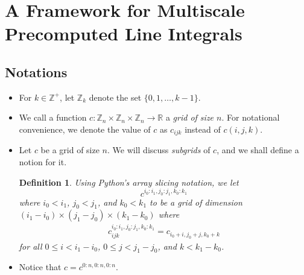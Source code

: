 \documentclass[10pt]{article}
\newtheorem{definition}[lemma]{Definition}
\begin{document}
\section{A Framework for Multiscale Precomputed Line Integrals}

\subsection{Notations}

\begin{itemize}
	\item For $k \in \mathbb{Z}^+$, let $\mathbb{Z}_k$ denote the set $\{ 0, 1, \dotsc, k-1 \}.$ 
	
	\item We call a function $c: \mathbb{Z}_n \times \mathbb{Z}_n \times \mathbb{Z}_n \rightarrow \mathbb{R}$ 
		a \emph{grid of size $n$}. For notational convenience, we denote the value of $c$ as 
		$c_{ijk}$ instead of $c(i,j,k).$
		
	\item Let $c$ be a grid of size $n$. We will discuss 
	    \emph{subgrids} of $c$, and we shall define a notion 
	    for it. 
	    
	    \begin{definition}
	    Using Python's array slicing notation, 
	    we let $$c^{i_0:i_1, j_0:j_1, k_0:k_1}$$
	    where $i_0 < i_1$, $j_0 < j_1$, and $k_0 < k_1$ to be a grid 
	    of dimension $(i_1-i_0) \times (j_1-j_0) \times (k_1-k_0)$
		where
		\begin{align*}
		    c^{i_0:i_1, j_0:j_1, k_0:k_1}_{ijk} = c_{i_0+i, j_0+j, k_0+k}
		\end{align*}
		for all $0 \leq i < i_1-i_0$, $0 \leq j < j_1-j_0$,
		and $k < k_1-k_0$.
	    \end{definition}
	
	\item Notice that $c = c^{0:n,0:n,0:n}$.
	

\end{itemize}
\end{document}
